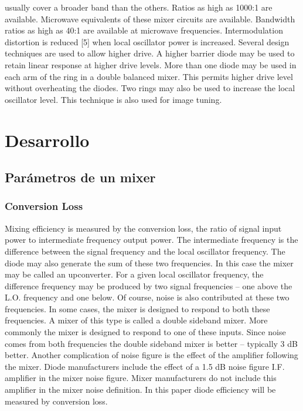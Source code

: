 \documentclass[a4paper,10pt]{article}
\begin{document}
	usually cover a broader band than the others. Ratios as high as 1000:1
	are available. Microwave equivalents of these mixer circuits are
	available. Bandwidth ratios as high as 40:1 are available at microwave
	frequencies.
	Intermodulation distortion is reduced [5] when local oscillator power is
	increased. Several design techniques are used to allow higher drive.
	A higher barrier diode may be used to retain linear response at higher
	drive levels. More than one diode may be used in each arm of the ring
	in a double balanced mixer. This permits higher drive level without
	overheating the diodes. Two rings may also be used to increase the
	local oscillator level. This technique is also used for image tuning.


\newpage
\section{Desarrollo}
	\subsection{Parámetros de un mixer}
		\subsubsection{Conversion Loss}
		Mixing efficiency is measured by the conversion loss, the ratio of signal
		input power to intermediate frequency output power. The intermediate
		frequency is the difference between the signal frequency and the local
		oscillator frequency. The diode may also generate the sum of these two
		frequencies. In this case the mixer may be called an upconverter. For a
		given local oscillator frequency, the difference frequency may be
		produced by two signal frequencies – one above the L.O. frequency and
		one below. Of course, noise is also contributed at these two
		frequencies. In some cases, the mixer is designed to respond to both
		these frequencies. A mixer of this type is called a double sideband
		mixer. More commonly the mixer is designed to respond to one of
		these inputs. Since noise comes from both frequencies the double
		sideband mixer is better – typically 3 dB better.
				Another complication of noise figure is the effect of the amplifier
		following the mixer. Diode manufacturers include the effect of a 1.5 dB
		noise figure I.F. amplifier in the mixer noise figure. Mixer
		manufacturers do not include this amplifier in the mixer noise
		definition. In this paper diode efficiency will be measured by
		conversion loss.
		
\end{document}
